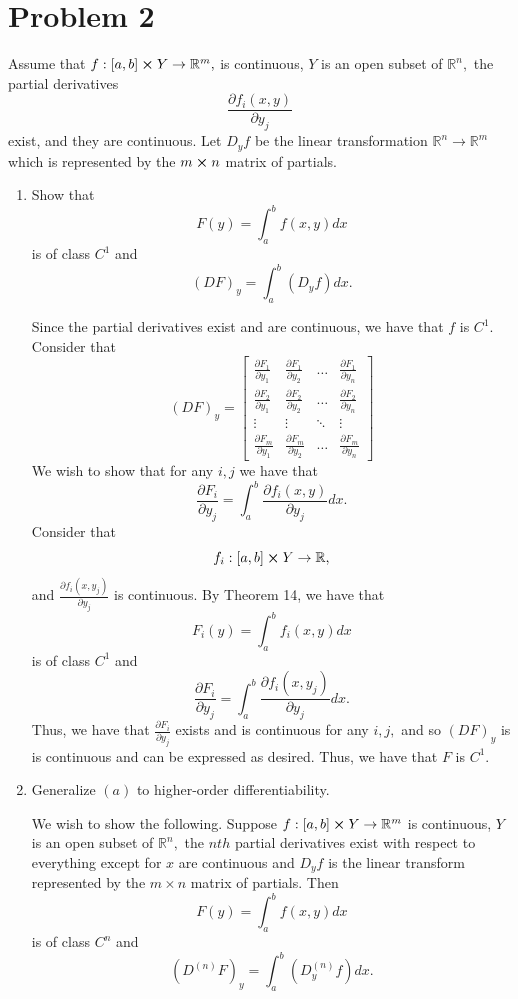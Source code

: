 \documentclass[11pt]{article}
\newcommand{\bbR}{\mathbb{R}}
\begin{document}
\section*{Problem 2}
\begin{problem}
Assume that $f: [a,b] \cross Y \to \bbR^m,$ is continuous, $Y$ is an open subset of $\bbR^n,$ the partial derivatives 
\[\frac{\partial f_i(x,y)}{\partial y_j}\] exist, and they are continuous. Let $D_yf$ be the linear transformation $\bbR^n \to \bbR^m$ which is represented by the $m \cross n$ matrix of partials.
\end{problem}

\begin{enumerate}
    \item 
    \begin{problem}
        Show that 
        \[F(y) = \int_a^b f(x,y)dx\] is of class $C^1$ and 
        \[(DF)_y = \int_a^b (D_yf)dx.\]
    \end{problem}
    \begin{solution}
        Since the partial derivatives exist and are continuous, we have that $f$ is $C^1.$ Consider that 
        \[(DF)_y = \begin{bmatrix}
            \frac{\partial F_1}{\partial y_1} & \frac{\partial F_1}{\partial y_2} & \dots & \frac{\partial F_1}{\partial y_n}\\
            \frac{\partial F_2}{\partial y_1} & \frac{\partial F_2}{\partial y_2} & \dots & \frac{\partial F_2}{\partial y_n}\\
            \vdots & \vdots & \ddots & \vdots \\
            \frac{\partial F_m}{\partial y_1} & \frac{\partial F_m}{\partial y_2} & \dots & \frac{\partial F_m}{\partial y_n}
        \end{bmatrix}\] We wish to show that for any $i,j$ we have that 
        \[\frac{\partial F_i}{\partial y_j} = \int_a^b \frac{\partial f_i(x,y)}{\partial y_j}dx.\] Consider that 
        \[f_i: [a,b] \cross Y \to \bbR,\] and $\frac{\partial f_i(x,y_j)}{\partial y_j}$ is continuous. By Theorem 14, we have that 
        \[F_i(y) = \int_a^b f_i(x,y) dx\] is of class $C^1$ and 
        \[\frac{\partial F_i}{\partial y_j} = \int_a^b \frac{\partial f_i(x,y_j)}{\partial y_j}dx.\] Thus, we have that $\frac{\partial F_i}{\partial y_j}$ exists and is continuous for any $i,j,$ and so $(DF)_y$ is is continuous and can be expressed as desired. Thus, we have that $F$ is $C^1.$
    \end{solution}
    \item 
    \begin{problem}
         Generalize $(a)$ to higher-order differentiability.
    \end{problem}
    \begin{solution}
    We wish to show the following. Suppose $f: [a,b]\cross Y \to \bbR^m$ is continuous, $Y$ is an open subset of $\bbR^n,$ the $nth$ partial derivatives exist with respect to everything except for $x$ are continuous and $D_yf$ is the linear transform represented by the $m\times n$ matrix of partials. Then 
    \[F(y) = \int_a^b f(x,y)dx\] is of class $C^n$ and 
    \[(D^{(n)}F)_y = \int_a^b (D^{(n)}_yf)dx.\]
    

\end{solution}
\end{enumerate}
\end{document}
